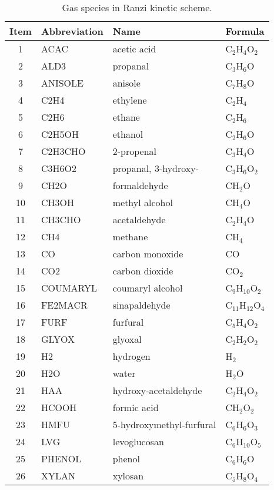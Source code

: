 \begin{table}[H]
    \centering
    \caption{Gas species in Ranzi kinetic scheme.}
    \begin{tabular}{@{}clll@{}}
        \toprule
        Item & Abbreviation & Name & Formula \\
        \midrule
        1   & ACAC      & acetic acid               & C$_2$H$_4$O$_2$ \\
        2   & ALD3      & propanal                  & C$_3$H$_6$O \\
        3   & ANISOLE   & anisole                   & C$_7$H$_8$O \\
        4   & C2H4      & ethylene                  & C$_2$H$_4$ \\
        5   & C2H6      & ethane                    & C$_2$H$_6$ \\
        6   & C2H5OH    & ethanol                   & C$_2$H$_6$O \\
        7   & C2H3CHO   & 2-propenal                & C$_3$H$_4$O \\
        8   & C3H6O2    & propanal, 3-hydroxy-      & C$_3$H$_6$O$_2$ \\
        9   & CH2O      & formaldehyde              & CH$_2$O \\
        10  & CH3OH     & methyl alcohol            & CH$_4$O \\
        11  & CH3CHO    & acetaldehyde              & C$_2$H$_4$O \\
        12  & CH4       & methane                   & CH$_4$ \\
        13  & CO        & carbon monoxide           & CO \\
        14  & CO2       & carbon dioxide            & CO$_2$ \\
        15  & COUMARYL  & coumaryl alcohol          & C$_9$H$_{10}$O$_2$ \\
        16  & FE2MACR   & sinapaldehyde             & C$_{11}$H$_{12}$O$_4$ \\
        17  & FURF      & furfural                  & C$_5$H$_4$O$_2$   \\
        18  & GLYOX     & glyoxal                   & C$_2$H$_2$O$_2$ \\
        19  & H2        & hydrogen                  & H$_2$ \\
        20  & H2O       & water                     & H$_2$O \\
        21  & HAA       & hydroxy-acetaldehyde      & C$_2$H$_4$O$_2$ \\
        22  & HCOOH     & formic acid               & CH$_2$O$_2$ \\
        23  & HMFU      & 5-hydroxymethyl-furfural  & C$_6$H$_6$O$_3$ \\
        24  & LVG       & levoglucosan              & C$_6$H$_{10}$O$_5$ \\
        25  & PHENOL    & phenol                    & C$_6$H$_6$O \\
        26  & XYLAN     & xylosan                   & C$_5$H$_8$O$_4$ \\
        \bottomrule
    \end{tabular}
\end{table}
